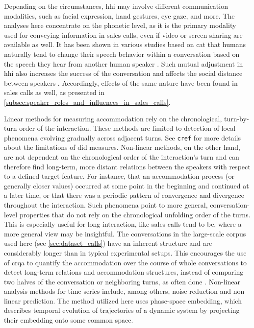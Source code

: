 Depending on the circumstances, \ac{hhi} may involve different communication modalities, such as facial expression, hand gestures, eye gaze, and more.
The analyses here concentrate on the phonetic level, as it is the primary modality used for conveying information in sales calls, even if video or screen sharing are available as well.
It has been shown in various studies based on \ac{cat} \citep[][and cf.\ \cref{sec:communication_accommodation_theory}]{Giles1991CAT, Gallois2015CAT} that humans naturally tend to change their speech behavior within a conversation based on the speech they hear from another human speaker \citep[see, e.g.][]{Bailly2010speech, Babel2014novelty}.
Such mutual adjustment in \ac{hhi} also increases the success of the conversation \citep{Pickering2004behavioral} and affects the social distance between speakers \citep{Schweitzer2017social}.
Accordingly, effects of the same nature have been found in sales calls as well, as presented in \cref{subsec:speaker_roles_and_influences_in_sales_calls}. 

Linear methods for measuring accommodation rely on the chronological, turn-by-turn order of the interaction.
These methods are limited to detection of local phenomena evolving gradually across adjacent turns.
See \texttt{cref} for more details about the limitations of \ac{did} measures.
Non-linear methods, on the other hand, are not dependent on the chronological order of the interaction's turn and can therefore find long-term, more distant relations between the speakers with respect to a defined target feature.
For instance, that an accommodation process (or generally closer values) occurred at some point in the beginning and continued at a later time, or that there was a periodic pattern of convergence and divergence throughout the interaction.
Such phenomena point to more general, conversation-level properties that do not rely on the chronological unfolding order of the turns.
This is especially useful for long interaction, like sales calls tend to be, where a more general view may be insightful.
The conversations in the large-scale corpus used here (see \cref{sec:dataset_calls}) have an inherent structure and are considerably longer than in typical experimental setups.
This encourages the use of \ac{crqa} to quantify the accommodation over the course of whole conversations to detect long-term relations and accommodation structures, instead of comparing two halves of the conversation or neighboring turns, as often done \citep{Levitan2013entrainment,Rahimi2018weighting}.
Non-linear analysis methods for time series include, among others, noise reduction and non-linear prediction.
The method utilized here uses phase-space embedding, which describes temporal evolution of trajectories of a dynamic system by projecting their embedding onto some common space.

